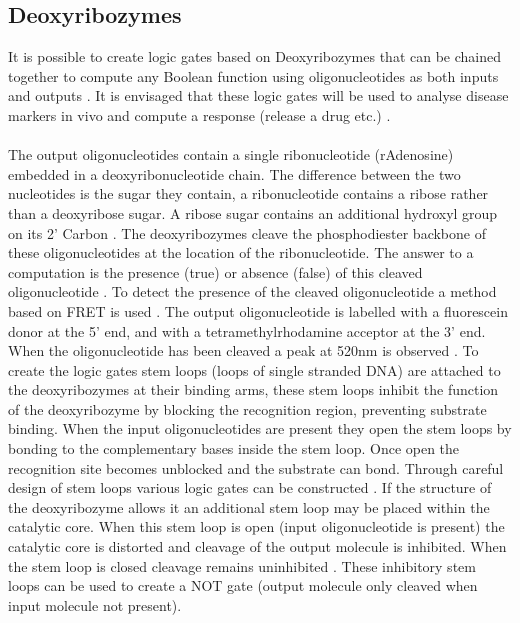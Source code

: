 \documentclass[11pt,a4paper,portrait]{article}
\begin{document}
\subsection{Deoxyribozymes}
It is possible to create logic gates based on Deoxyribozymes that can be chained together to compute any Boolean function using oligonucleotides as both inputs and outputs \cite{DeoxyribozymeLogic}. It is envisaged that these logic gates will be used to analyse disease markers in vivo and compute a response (release a drug etc.) \cite{LigaseLogic}.
\\\\
The output oligonucleotides contain a single ribonucleotide (rAdenosine) embedded in a deoxyribonucleotide chain. The difference between the two nucleotides is the sugar they contain, a ribonucleotide contains a ribose rather than a deoxyribose sugar. A ribose sugar contains an additional hydroxyl group on its 2' Carbon \cite{paun2013DNA}. The deoxyribozymes cleave the phosphodiester backbone of these oligonucleotides at the location of the ribonucleotide. The answer to a computation is the presence (true) or absence (false) of this cleaved oligonucleotide \cite{DeoxyribozymeLogic}. To detect the presence of the cleaved oligonucleotide a method based on FRET is used \cite{FRET}. The output oligonucleotide is labelled with a fluorescein donor at the 5' end, and with a tetramethylrhodamine acceptor at the 3' end. When the oligonucleotide has been cleaved a peak at 520nm is observed \cite{DeoxyribozymeLogic}. To create the logic gates stem loops (loops of single stranded DNA) are attached to the deoxyribozymes at their binding arms, these stem loops inhibit the function of the deoxyribozyme by blocking the recognition region, preventing substrate binding. When the input oligonucleotides are present they open the stem loops by bonding to the complementary bases inside the stem loop. Once open the recognition site becomes unblocked and the substrate can bond. Through careful design of stem loops various logic gates can be constructed \cite{DeoxyribozymeLogic}. If the structure of the deoxyribozyme allows it an additional stem loop may be placed within the catalytic core. When this stem loop is open (input oligonucleotide is present) the catalytic core is distorted and cleavage of the output molecule is inhibited. When the stem loop is closed cleavage remains uninhibited \cite{Stojanovic2014}. These inhibitory stem loops can be used to create a NOT gate (output molecule only cleaved when input molecule not present). 
\end{document}
